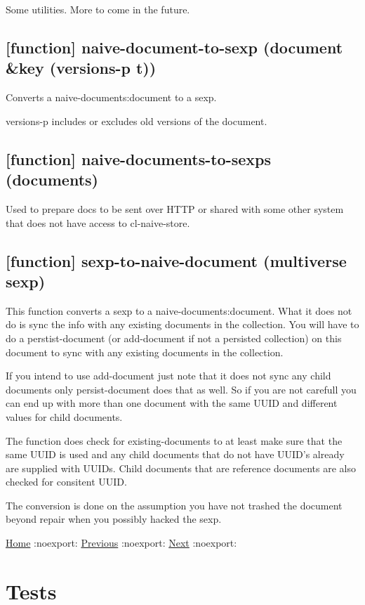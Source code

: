 \documentclass[11pt]{article}
\begin{document}
Some utilities. More to come in the future.

\subsection{[function] naive-document-to-sexp (document \&key (versions-p t))}
\label{sec:org113e4e7}

Converts a naive-documents:document to a sexp.

versions-p includes or excludes old versions of the document.

\subsection{[function] naive-documents-to-sexps (documents)}
\label{sec:org66ef9aa}

Used to prepare docs to be sent over HTTP or shared with some other
system that does not have access to cl-naive-store.

\subsection{[function] sexp-to-naive-document (multiverse sexp)}
\label{sec:org30e8622}

This function converts a sexp to a naive-documents:document. What it does not do is
sync the info with any existing documents in the collection. You will
have to do a perstist-document (or add-document if not a persisted
collection) on this document to sync with any existing documents in
the collection.

If you intend to use add-document just note that it does not sync any
child documents only persist-document does that as well. So if you are
not carefull you can end up with more than one document with the same
UUID and different values for child documents.

The function does check for existing-documents to at least make sure
that the same UUID is used and any child documents that do not have UUID's
already are supplied with UUIDs. Child documents that are reference
documents are also checked for consitent UUID.

The conversion is done on the assumption you have not trashed the document
beyond repair when you possibly hacked the sexp.

\href{home.org}{Home} :noexport: \href{implementor-api.org}{Previous} :noexport: \href{tests.org}{Next} :noexport:
\section{Tests}
\label{sec:org1534a29}
\end{document}
